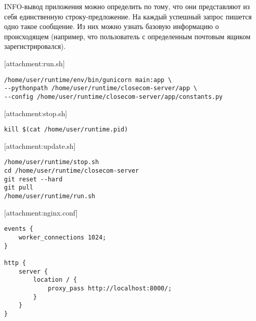 \documentclass[progmanual]{espd}
\begin{document}
INFO-вывод приложения можно определить по тому, что они представляют из себя единственную строку-предложение. На каждый успешный запрос пишется одно такое сообщение. Из них можно узнать базовую информацию о происходящем (например, что пользователь с определенным почтовым ящиком зарегистрировался).



[attachment:run.sh]
\begin{verbatim}
/home/user/runtime/env/bin/gunicorn main:app \
--pythonpath /home/user/runtime/closecom-server/app \
--config /home/user/runtime/closecom-server/app/constants.py
\end{verbatim}

[attachment:stop.sh]
\begin{verbatim}
kill $(cat /home/user/runtime.pid)
\end{verbatim}

[attachment:update.sh]
\begin{verbatim}
/home/user/runtime/stop.sh
cd /home/user/runtime/closecom-server
git reset --hard
git pull
/home/user/runtime/run.sh
\end{verbatim}

[attachment:nginx.conf]
\begin{verbatim}
events {
    worker_connections 1024;
}

http {
    server {
        location / {
            proxy_pass http://localhost:8000/;
        }
    }
}
\end{verbatim}
\end{document}
